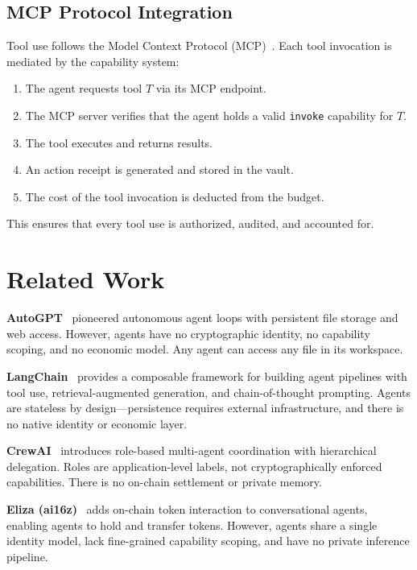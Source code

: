 \documentclass[11pt,a4paper]{article}
\begin{document}
\subsection{MCP Protocol Integration}

Tool use follows the Model Context Protocol (MCP)~\cite{anthropic2024mcp}. Each tool invocation is mediated by the capability system:

\begin{enumerate}
    \item The agent requests tool $T$ via its MCP endpoint.
    \item The MCP server verifies that the agent holds a valid \texttt{invoke} capability for $T$.
    \item The tool executes and returns results.
    \item An action receipt is generated and stored in the vault.
    \item The cost of the tool invocation is deducted from the budget.
\end{enumerate}

This ensures that every tool use is authorized, audited, and accounted for.

\section{Related Work}\label{sec:related}

\textbf{AutoGPT}~\cite{autogpt2023} pioneered autonomous agent loops with persistent file storage and web access. However, agents have no cryptographic identity, no capability scoping, and no economic model. Any agent can access any file in its workspace.

\textbf{LangChain}~\cite{langchain2023} provides a composable framework for building agent pipelines with tool use, retrieval-augmented generation, and chain-of-thought prompting. Agents are stateless by design---persistence requires external infrastructure, and there is no native identity or economic layer.

\textbf{CrewAI}~\cite{crewai2024} introduces role-based multi-agent coordination with hierarchical delegation. Roles are application-level labels, not cryptographically enforced capabilities. There is no on-chain settlement or private memory.

\textbf{Eliza (ai16z)}~\cite{ai16z2024eliza} adds on-chain token interaction to conversational agents, enabling agents to hold and transfer tokens. However, agents share a single identity model, lack fine-grained capability scoping, and have no private inference pipeline.
\end{document}
